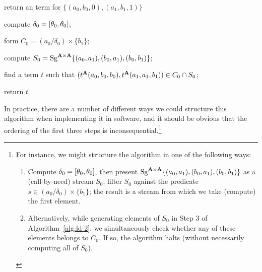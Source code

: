 \LinesNumbered
\begin{algorithm}%

  \caption{return an \ld term for $\{(a_0,b_0,0), (a_1, b_1, 1)\}$ \label{alg:ld-2}  }

  compute $\delta_0 = [ \theta_0 ,  \theta_0 ]$;

  form $C_0= (a_0/\delta_0) \times \{b_1\}$;

  compute $S_0=\operatorname{Sg}^{\mathbf{A}\times \mathbf{A}} \{(a_0,a_1),(b_0,a_1),(b_0,b_1)\}$;

  find a term $t$ such that
  $(t^{\mathbf{A}}(a_0,b_0,b_0), t^{\mathbf{A}}(a_1,a_1,b_1)) \in C_0 \cap S_0$;

return $t$
\end{algorithm}
In practice, there are a number of different ways we could structure this 
algorithm when implementing it in software, and it should be obvious 
that the ordering of the first three steps is inconsequential.\footnote{
  For instance, we might structure the algorithm in one of the following ways:
  \begin{enumerate}
    \item Compute $\delta_0 = [ \theta_0 ,  \theta_0 ]$, then 
    present $\operatorname{Sg}^{\mathbf{A}\times \mathbf{A}} \{(a_0,a_1),(b_0,a_1),(b_0,b_1)\}$
    as a (call-by-need) stream $S_0$; filter $S_0$ against the predicate 
    $s \in (a_0/\delta_0) \times \{b_1\}$; the result is a stream from 
    which we take (compute) the first element.
    \item Alternatively, while generating elements of $S_0$ in Step 3
    of Algorithm~\ref{alg:ld-2}, we simultaneously check whether
    any of these elements belongs to $C_0$.  If so, the algorithm
    halts (without necessarily computing all of $S_0$).
  \end{enumerate}  %
  }

